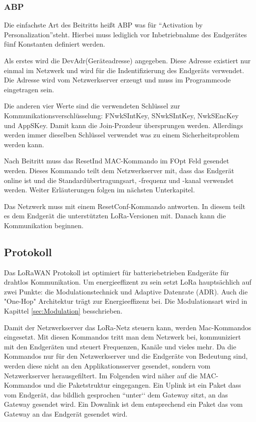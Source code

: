 \documentclass[a4paper, 12pt]{article}
\begin{document}
            \subsubsection{ABP}
                Die einfachste Art des Beitritts heißt ABP was für ``Activation by Personalization''steht. 
                Hierbei muss lediglich vor Inbetriebnahme des 
                Endgerätes fünf Konstanten definiert werden. 

                Als erstes wird die DevAdr(Geräteadresse) angegeben. Diese Adresse existiert nur einmal im 
                Netzwerk und wird für die Indentifizierung des Endgeräts verwendet. Die Adresse wird vom Netzwerkserver 
                erzeugt und muss im Programmcode eingetragen sein.

                Die anderen vier Werte sind die verwendeten Schlüssel zur Kommunikationsverschlüsselung:  
                FNwkSIntKey, SNwkSIntKey, NwkSEncKey und AppSKey. Damit kann die Join-Prozdeur 
                übersprungen werden. Allerdings werden immer dieselben Schlüssel verwendet was zu einem 
                Sicherheitsproblem werden kann.

                Nach Beitritt muss das ResetInd MAC-Kommando im FOpt Feld gesendet werden. Dieses Kommando 
                teilt dem Netzwerkserver mit, dass das Endgerät online ist und die Standardübertragungsart, 
                -frequenz und -kanal verwendet werden. Weiter Erläuterungen folgen im nächsten Unterkapitel.

                Das Netzwerk muss  mit einem ResetConf-Kommando antworten. In diesem teilt es dem Endgerät die
                unterstützten LoRa-Versionen mit. Danach kann die Kommunikation beginnen.
        \subsection{Protokoll} \label{sec:protokoll}
            Das LoRaWAN Protokoll ist optimiert für batteriebetrieben Endgeräte für drahtlos Kommunikation. 
            Um energieeffizent zu sein setzt LoRa hauptsächlich auf zwei Punkte: die Modulationstechnick und  
            Adaptive Datenrate (ADR). Auch die 
            "One-Hop" Architektur trägt zur Energieeffizenz bei. Die Modulationsart wird in Kapittel 
            \ref{sec:Modulation}  besschrieben. \cite[S,1 f]{LoraClasses}


            Damit der Netzwerkserver das LoRa-Netz steuern kann, werden Mac-Kommandos eingesetzt. Mit diesen 
            Kommandos tritt man dem Netzwerk bei, kommuniziert mit den Endgeräten und steuert
            Frequenzen, Kanäle und vieles mehr.
            Da die Kommandos nur für den Netzwerkserver und die Endgeräte von Bedeutung sind, werden diese nicht an 
            den Applikationsserver gesendet, sondern vom Netzwerkserver herausgefiltert. Im Folgenden wird näher auf 
            die MAC-Kommandos und die Paketstruktur eingegangen.
            Ein Uplink ist ein Paket dass vom Endgerät, das bildlich gesprochen ``unter‘‘ dem Gateway sitzt, an das 
            Gateway gesendet wird. Ein Downlink ist dem entsprechend ein Paket das vom Gateway an das Endgerät gesendet 
            wird.
\end{document}
